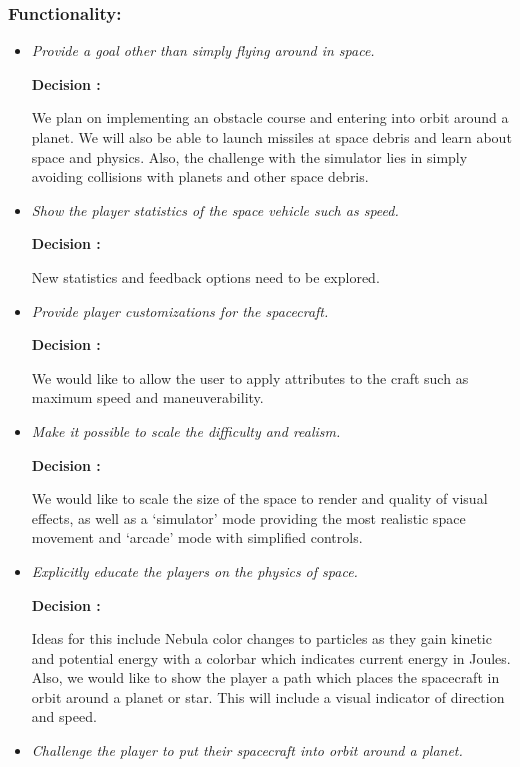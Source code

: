 \subsubsection{Functionality:}
\begin{itemize}
  \item \emph{Provide a goal other than simply flying around in space.}
        
        \textbf{Decision : } \parbox[t]{5in}{We plan on implementing an obstacle course and entering into orbit around a planet.  We will also be able to launch missiles at space debris and learn about space and physics.  Also, the challenge with the simulator lies in simply avoiding collisions with planets and other space debris.}

  \item \emph{Show the player statistics of the space vehicle such as speed.}
        
        \textbf{Decision : } \parbox[t]{5in}{New statistics and feedback options need to be explored.}

  \item \emph{Provide player customizations for the spacecraft.}
        
        \textbf{Decision : } \parbox[t]{5in}{We would like to allow the user to apply attributes to the craft such as maximum speed and maneuverability.}

  \item \emph{Make it possible to scale the difficulty and realism.}
        
        \textbf{Decision : } \parbox[t]{5in}{We would like to scale the size of the space to render and quality of visual effects, as well as a `simulator' mode providing the most realistic space movement and `arcade' mode with simplified controls.}

  \item \emph{Explicitly educate the players on the physics of space.}
        
        \textbf{Decision : } \parbox[t]{5in}{Ideas for this include Nebula color changes to particles as they gain kinetic and potential energy with a colorbar which indicates current energy in Joules.  Also, we would like to show the player a path which places the spacecraft in orbit around a planet or star.  This will include a visual indicator of direction and speed.}

  \item \emph{Challenge the player to put their spacecraft into orbit around a planet.}
        

\end{itemize}
